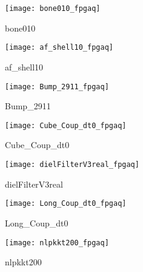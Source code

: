 \begin{figure}[H]
    \begin{center}
        \texttt{[image: bone010\_fpgaq]}
    \end{center}
    \caption{bone010}
    \label{fig:bone010_fpgaq}
\end{figure}

\begin{figure}[H]
    \begin{center}
        \texttt{[image: af\_shell10\_fpgaq]}
    \end{center}
    \caption{af\_shell10}
    \label{fig:af_shell10_fpgaq}
\end{figure}

\begin{figure}[H]
    \begin{center}
        \texttt{[image: Bump\_2911\_fpgaq]}
    \end{center}
    \caption{Bump\_2911}
    \label{fig:Bump_2911_fpgaq}
\end{figure}

\begin{figure}[H]
    \begin{center}
        \texttt{[image: Cube\_Coup\_dt0\_fpgaq]}
    \end{center}
    \caption{Cube\_Coup\_dt0}
    \label{fig:Cube_Coup_dt0_fpgaq}
\end{figure}

\begin{figure}[H]
    \begin{center}
        \texttt{[image: dielFilterV3real\_fpgaq]}
    \end{center}
    \caption{dielFilterV3real}
    \label{fig:dielFilterV3real_fpgaq}
\end{figure}


\begin{figure}[H]
    \begin{center}
        \texttt{[image: Long\_Coup\_dt0\_fpgaq]}
    \end{center}
    \caption{Long\_Coup\_dt0}
    \label{fig:Long_Coup_dt0_fpgaq}
\end{figure}

\begin{figure}[H]
    \begin{center}
        \texttt{[image: nlpkkt200\_fpgaq]}
    \end{center}
    \caption{nlpkkt200}
    \label{fig:nlpkkt200_fpgaq}
\end{figure}


